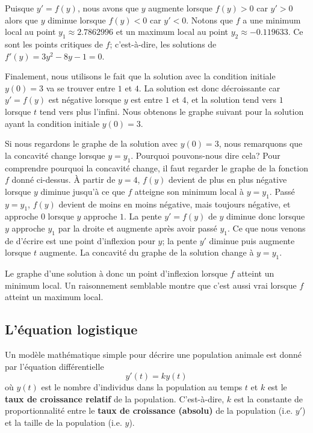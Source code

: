 {\begin{egg}
Puisque $y'=f(y)$, nous avons que $y$ augmente lorsque $f(y)>0$ car $y'>0$
alors que $y$ diminue lorsque $f(y)<0$ car $y'<0$.  Notons que $f$ a
une minimum local au point $y_1 \approx 2.7862996$ et un maximum
local au point $y_2 \approx -0.119633$.   Ce sont les points
critiques de $f$; c'est-à-dire, les solutions de
$f'(y)= 3y^2 -8 y -1 =0$.

Finalement, nous utilisons
le fait que la solution avec la condition initiale $y(0)=3$ va se
trouver entre $1$ et $4$.  La solution est donc décroissante car
$y' = f(y)$ est négative lorsque $y$ est entre $1$ et $4$, et la
solution tend vers $1$ lorsque $t$ tend vers plus l'infini.  Nous
obtenons le graphe suivant pour la solution ayant la condition
initiale $y(0)=3$.

Si nous regardons le graphe de la solution avec $y(0)=3$, nous
remarquons que la concavité change lorsque $y = y_1$.  Pourquoi
pouvons-nous dire cela?   Pour comprendre pourquoi la concavité
change, il faut regarder le graphe de la fonction $f$ donné ci-dessus.
À partir de $y=4$, $f(y)$ devient de plus en plus négative lorsque $y$
diminue jusqu'à ce que $f$ atteigne son minimum local à $y=y_1$.
Passé $y=y_1$, $f(y)$ devient de moins en moins négative,
mais toujours négative, et approche $0$ lorsque $y$ approche $1$.  La
pente $y'=f(y)$ de $y$ diminue donc lorsque $y$ approche $y_1$ par la
droite et augmente après avoir passé $y_1$.  Ce que nous venons de
d'écrire est une point d'inflexion pour $y$; la pente $y'$ diminue
puis augmente lorsque $t$ augmente.  La concavité du graphe de la
solution change à $y = y_1$.

Le graphe d'une solution à donc un point d'inflexion lorsque $f$
atteint un minimum local.  Un raisonnement semblable montre que c'est
aussi vrai lorsque $f$ atteint un maximum local.
\end{egg}

\subsection{L'équation logistique}

Un modèle mathématique simple pour décrire une population animale est
donné par l'équation différentielle
\begin{equation}\label{simple_pop_model}
y'(t) = k y(t)
\end{equation}
où $y(t)$ est le nombre d'individus dans la population au temps $t$ et
$k$ est le
{\bfseries taux de croissance relatif}
de la population.   C'est-à-dire, $k$ est la constante de
proportionnalité entre le
{\bfseries taux de croissance (absolu)}
de la population (i.e. $y'$) et la taille de la population (i.e. $y$).

}
